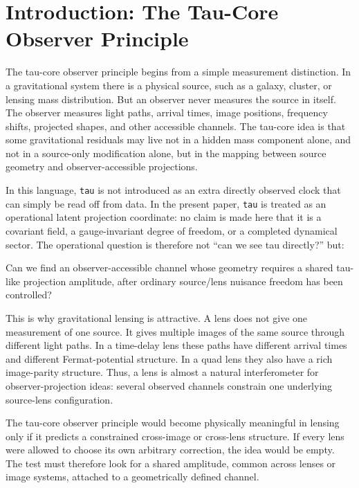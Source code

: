 \documentclass[11pt]{article}
\newenvironment{Shaded}{}{}
\newcommand{\NormalTok}[1]{#1}
\begin{document}
\section{Introduction: The Tau-Core Observer
Principle}\label{introduction-the-tau-core-observer-principle}

The tau-core observer principle begins from a simple measurement
distinction. In a gravitational system there is a physical source, such
as a galaxy, cluster, or lensing mass distribution. But an observer
never measures the source in itself. The observer measures light paths,
arrival times, image positions, frequency shifts, projected shapes, and
other accessible channels. The tau-core idea is that some gravitational
residuals may live not in a hidden mass component alone, and not in a
source-only modification alone, but in the mapping between source
geometry and observer-accessible projections.

In this language, \texttt{tau} is not introduced as an extra directly
observed clock that can simply be read off from data. In the present
paper, \texttt{tau} is treated as an operational latent projection
coordinate: no claim is made here that it is a covariant field, a
gauge-invariant degree of freedom, or a completed dynamical sector. The
operational question is therefore not ``can we see tau directly?'' but:

\begin{Shaded}
\begin{Highlighting}[]
\NormalTok{Can we find an observer{-}accessible channel whose geometry requires a shared}
\NormalTok{tau{-}like projection amplitude, after ordinary source/lens nuisance freedom has}
\NormalTok{been controlled?}
\end{Highlighting}
\end{Shaded}

This is why gravitational lensing is attractive. A lens does not give
one measurement of one source. It gives multiple images of the same
source through different light paths. In a time-delay lens these paths
have different arrival times and different Fermat-potential structure.
In a quad lens they also have a rich image-parity structure. Thus, a
lens is almost a natural interferometer for observer-projection ideas:
several observed channels constrain one underlying source-lens
configuration.

The tau-core observer principle would become physically meaningful in
lensing only if it predicts a constrained cross-image or cross-lens
structure. If every lens were allowed to choose its own arbitrary
correction, the idea would be empty. The test must therefore look for a
shared amplitude, common across lenses or image systems, attached to a
geometrically defined channel.
\end{document}
